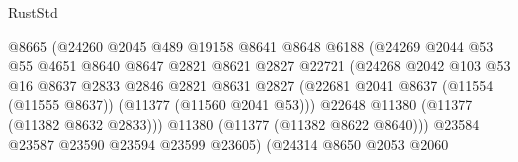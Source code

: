 \begin{lexlean}{RustStd}
\begin{coremodule}
                                        @8665
                                        (@24260
                                          @2045
                                          @489
                                          @19158
                                          @8641
                                          @8648
                                          @6188
                                          (@24269
                                            @2044
                                            @53
                                            @55
                                            @4651
                                            @8640
                                            @8647
                                            @2821
                                            @8621
                                            @2827
                                            @22721
                                            (@24268
                                              @2042
                                              @103
                                              @53
                                              @16
                                              @8637
                                              @2833
                                              @2846
                                              @2821
                                              @8631
                                              @2827
                                              (@22681
                                                @2041
                                                @8637
                                                (@11554 (@11555 @8637))
                                                (@11377 (@11560 @2041 @53)))
                                              @22648
                                              @11380
                                              (@11377 (@11382 @8632 @2833)))
                                            @11380
                                            (@11377 (@11382 @8622 @8640)))
                                          @23584
                                          @23587
                                          @23590
                                          @23594
                                          @23599
                                          @23605)
                                        (@24314
                                          @8650
                                          @2053
                                          @2060

\end{coremodule}
\end{lexlean}
